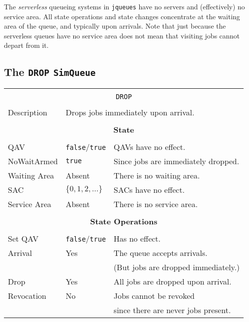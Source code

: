 \documentclass[12pt]{book}
\begin{document}
The {\em serverless\/} queueing systems in \lstinline|jqueues| 
  have no servers and (effectively) no service area.
All state operations and state changes concentrate
  at the waiting area of the queue,
  and typically upon arrivals.
Note that just because the serverless queues have no service area
  does not mean that visiting jobs cannot depart from it.

\subsection{The \lstinline{DROP} \lstinline{SimQueue}}

\begin{tabular}{|l|l|l|}
\hline
\multicolumn{3}{|c|}{} \\
\multicolumn{3}{|c|}{\lstinline[basicstyle=\large]{DROP}} \\
\multicolumn{3}{|c|}{} \\
\hline
Description & \multicolumn{2}{|l|}{Drops jobs immediately upon arrival.} \\
\hline
\multicolumn{3}{|c|}{} \\
\multicolumn{3}{|c|}{\bf State} \\
\multicolumn{3}{|c|}{} \\
\hline
QAV & \lstinline|false|/\lstinline|true| & QAVs have no effect. \\
\hline
NoWaitArmed & \lstinline|true| & Since jobs are immediately dropped. \\
\hline
Waiting Area & Absent & There is no waiting area. \\
\hline
SAC & $\{0, 1, 2, \ldots\}$ & SACs have no effect. \\
\hline
Service Area & Absent & There is no service area. \\
\hline
\multicolumn{3}{|c|}{} \\
\multicolumn{3}{|c|}{\bf State Operations} \\
\multicolumn{3}{|c|}{} \\
\hline
Set QAV & \lstinline|false|/\lstinline|true| & Has no effect. \\
\hline
Arrival & Yes & The queue accepts arrivals. \\
        &     & (But jobs are dropped immediately.) \\
\hline
Drop & Yes & All jobs are dropped upon arrival. \\
\hline
Revocation & No & Jobs cannot be revoked \\
           &    & since there are never jobs present. \\

\end{tabular}
\end{document}
